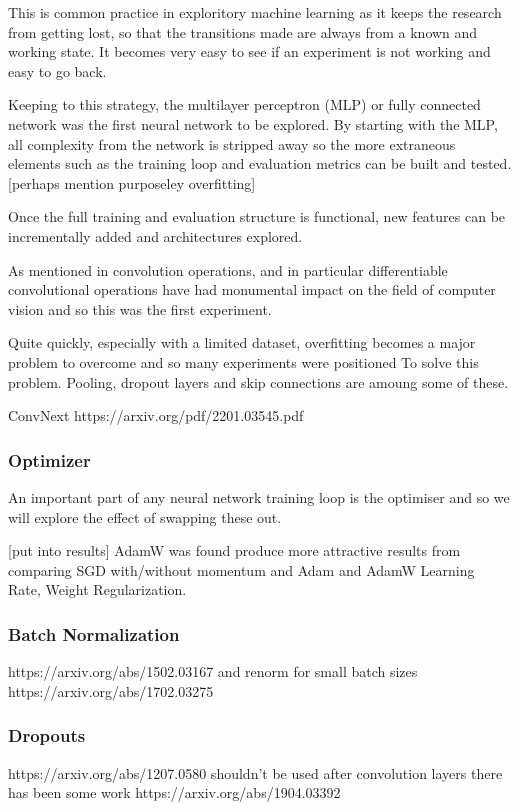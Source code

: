 This is common practice in exploritory \cite{} machine learning as it keeps the research from getting lost, so that the transitions
made are always from a known and working state.  It becomes very easy to see if an experiment is not working and easy to go back.

Keeping to this strategy, the multilayer perceptron (MLP) or fully connected network \cite{} was the first neural network to be explored.
By starting with the MLP, all complexity from the network is stripped away so the more extraneous elements such as the training loop and 
evaluation metrics can be built and tested.  [perhaps mention purposeley overfitting]

Once the full training and evaluation structure is functional, new features can be incrementally added and architectures explored.

As mentioned in  convolution operations, and in particular differentiable convolutional operations have had monumental 
impact on the field of computer vision and so this was the first experiment.

Quite quickly, especially with a limited dataset, overfitting becomes a major problem to overcome and so many experiments were positioned To
solve this problem.  Pooling, dropout layers and skip connections are amoung some of these.

ConvNext https://arxiv.org/pdf/2201.03545.pdf

\subsubsection{Optimizer}
An important part of any neural network training loop is the optimiser and so we will explore the effect of swapping these out.

[put into results]
AdamW was found produce more attractive results from comparing SGD with/without momentum and Adam and AdamW \cite{}
Learning Rate, Weight Regularization.

\subsubsection{Batch Normalization}
https://arxiv.org/abs/1502.03167 and renorm for small batch sizes https://arxiv.org/abs/1702.03275

\subsubsection{Dropouts}
https://arxiv.org/abs/1207.0580 shouldn't be used after convolution layers \cite{} there has been some work https://arxiv.org/abs/1904.03392

